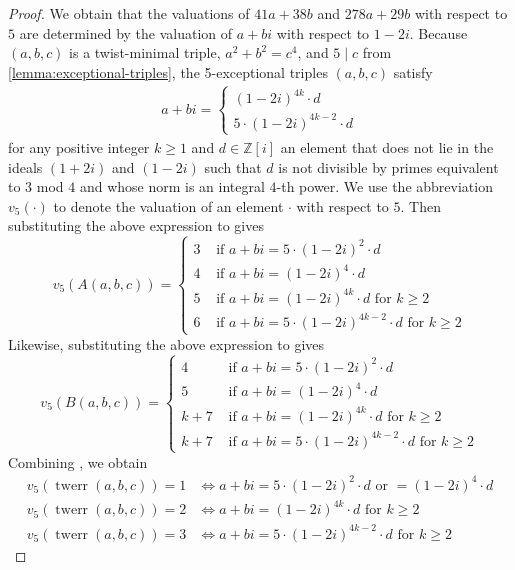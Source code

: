 \documentclass[12pt]{amsart}
\numberwithin{equation}{section} %
\theoremstyle{definition} \newtheorem{definition}[counter]{Definition}
\theoremstyle{remark} \newtheorem{nonexam}[counter]{Non-example}
\DeclareMathOperator{\twerr}{twerr} %
\begin{document}
\begin{proof}
    We obtain that the valuations of $41a + 38b$ and $278a + 29b$ with respect to $5$ are determined by the valuation of $a+bi$ with respect to $1-2i$. Because $(a,b,c)$ is a twist-minimal triple, $a^2 + b^2 = c^4$, and $5 \mid c$ from \ref{lemma:exceptional-triples}, the 5-exceptional triples $(a,b,c)$ satisfy
    \begin{align*}
        a+bi = \begin{cases}
            (1-2i)^{4k} \cdot d \\
            5 \cdot (1-2i)^{4k-2} \cdot d
        \end{cases}
    \end{align*}
    for any positive integer $k \geq 1$ and $d \in \mathbb{Z}[i]$ an element that does not lie in the ideals $(1+2i)$ and $(1-2i)$ such that $d$ is not divisible by primes equivalent to $3$ mod $4$ and whose norm is an integral $4$-th power. We use the abbreviation $v_5(\cdot)$ to denote the valuation of an element $\cdot$ with respect to $5$. Then substituting the above expression to  gives
    \begin{equation} \label{eq:5-val-A}
        v_5(A(a,b,c)) = \begin{cases}
            3 &\text{ if } a+bi = 5 \cdot (1-2i)^2 \cdot d \\
            4 &\text{ if } a+bi = (1-2i)^4 \cdot d \\
            5 &\text{ if } a+bi = (1-2i)^{4k} \cdot d \text{ for } k \geq 2 \\
            6 &\text{ if } a+bi = 5 \cdot (1-2i)^{4k-2} \cdot d \text{ for } k \geq 2
        \end{cases}
    \end{equation}
    Likewise, substituting the above expression to  gives
    \begin{equation} \label{eq:5-val-B}
        v_5(B(a,b,c)) = \begin{cases}
            4 &\text{ if } a+bi = 5 \cdot (1-2i)^2 \cdot d \\
            5 &\text{ if } a+bi = (1-2i)^4 \cdot d \\
            k + 7 &\text{ if } a+bi = (1-2i)^{4k} \cdot d \text{ for } k \geq 2 \\
            k + 7 &\text{ if } a+bi = 5 \cdot (1-2i)^{4k-2} \cdot d \text{ for } k \geq 2
        \end{cases}
    \end{equation}
    Combining , we obtain
    \begin{align*}
        v_5(\twerr(a,b,c)) = 1 &\iff a+bi = 5 \cdot (1-2i)^2 \cdot d \text{ or } = (1-2i)^4 \cdot d \\
        v_5(\twerr(a,b,c)) = 2 &\iff a+bi = (1-2i)^{4k} \cdot d \text{ for } k \geq 2 \\
        v_5(\twerr(a,b,c)) = 3 &\iff a+bi = 5 \cdot (1-2i)^{4k-2} \cdot d \text{ for } k \geq 2
    \end{align*}
\end{proof}
\end{document}
